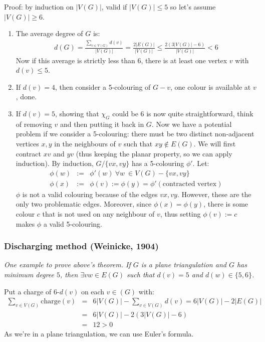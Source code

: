 		Proof: by induction on $|V(G)|$, valid if $|V(G)| \leq 5$ so let's assume $|V(G)| \geq 6$. 
		\begin{enumerate}
			\item The average degree of $G$ is:
				\begin{eqnarray}
					d(G) = \frac{\sum_{v \in V(G)} d(v)}{|V(G)|} = \frac{2 |E(G)|}{|V(G)|} \leq \frac{2 (3|V(G)| - 6)}{|V(G)|} < 6
				\end{eqnarray}
				Now if this average is strictly less than 6, there is at least one vertex $v$ with $d(v) \leq 5$.
			\item If $d(v) = 4$, then consider a 5-colouring of $G-v$, one colour is available at $v$, done.
			\item If $d(v) = 5$, showing that $\chi_{G}$ could be 6 is now quite straightforward, think of removing $v$ and then putting it back in $G$. Now we have a potential problem if we consider a 5-colouring: there must be two distinct non-adjacent vertices $x, y$ in the neighbours of $v$ such that $xy \notin E(G)$. We will first contract $xv$ and $yv$ (thus keeping the planar property, so we can apply induction). By induction, $G / \{ vx, vy \}$ has a 5-colouring $\phi'$. Let:
				\begin{eqnarray}
					\phi(w) &:=& \phi'(w) ~\forall w\ \in V(G) - \{ vx, vy \}\\
					\phi(x) &:=& \phi(v) := \phi(y) = \phi'(\text{contracted vertex})
				\end{eqnarray}
				$\phi$ is not a valid colouring because of the edges $vx, vy$. However, these are the only two problematic edges. Moreover, since $\phi(x) = \phi(y)$, there is some colour $c$ that is not used on any neighbour of $v$, thus setting $\phi(v) := c$ makes $\phi$ a valid 5-colouring.
		\end{enumerate}
		
		
		\subsubsection{Discharging method (Weinicke, 1904)}
		\textit{One example to prove above's theorem. If $G$ is a plane triangulation and $G$ has minimum degree $5$, then $\exists vw \in E(G)$ such that $d(v) = 5$ and $d(w) \in \{ 5, 6 \}$.\\}
		
		Put a charge of 6-$d(v)$ on each $v \in (G)$ with:
		\begin{eqnarray}
			\sum_{v \in V(G)} \text{charge}(v) &=& 6 |V(G)| - \sum_{v \in V(G)} d(v) = 6 |V(G)| - 2 |E(G)|\\
			&=& 6 |V(G)| - 2 (3|V(G)| - 6) \\
			&=& 12 > 0
		\end{eqnarray}
		As we're in a plane triangulation, we can use Euler's formula.\\
		
